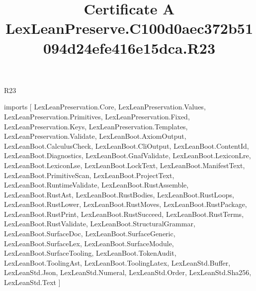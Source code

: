 \begin{lexlean}{R23}
\title{Certificate A LexLeanPreserve.C100d0aec372b51094d24efe416e15dca.R23}
\begin{coremodule}
imports [
  LexLeanPreservation.Core,
  LexLeanPreservation.Values,
  LexLeanPreservation.Primitives,
  LexLeanPreservation.Fixed,
  LexLeanPreservation.Keys,
  LexLeanPreservation.Templates,
  LexLeanPreservation.Validate,
  LexLeanBoot.AxiomOutput,
  LexLeanBoot.CalculusCheck,
  LexLeanBoot.CliOutput,
  LexLeanBoot.ContentId,
  LexLeanBoot.Diagnostics,
  LexLeanBoot.GnafValidate,
  LexLeanBoot.LexiconLre,
  LexLeanBoot.LexiconLse,
  LexLeanBoot.LockText,
  LexLeanBoot.ManifestText,
  LexLeanBoot.PrimitiveScan,
  LexLeanBoot.ProjectText,
  LexLeanBoot.RuntimeValidate,
  LexLeanBoot.RustAssemble,
  LexLeanBoot.RustAst,
  LexLeanBoot.RustBodies,
  LexLeanBoot.RustLoops,
  LexLeanBoot.RustLower,
  LexLeanBoot.RustMoves,
  LexLeanBoot.RustPackage,
  LexLeanBoot.RustPrint,
  LexLeanBoot.RustSucceed,
  LexLeanBoot.RustTerms,
  LexLeanBoot.RustValidate,
  LexLeanBoot.StructuralGrammar,
  LexLeanBoot.SurfaceDoc,
  LexLeanBoot.SurfaceGeneric,
  LexLeanBoot.SurfaceLex,
  LexLeanBoot.SurfaceModule,
  LexLeanBoot.SurfaceTooling,
  LexLeanBoot.TokenAudit,
  LexLeanBoot.ToolingAst,
  LexLeanBoot.ToolingLatex,
  LexLeanStd.Buffer,
  LexLeanStd.Json,
  LexLeanStd.Numeral,
  LexLeanStd.Order,
  LexLeanStd.Sha256,
  LexLeanStd.Text
]


\end{coremodule}
\end{lexlean}

